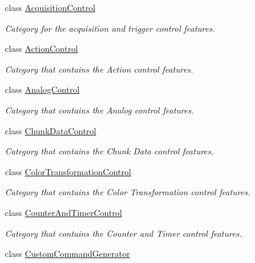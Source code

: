 \begin{DoxyCompactItemize}
\item 
class \hyperlink{classmv_i_m_p_a_c_t_1_1acquire_1_1_gen_i_cam_1_1_acquisition_control}{Acquisition\+Control}
\begin{DoxyCompactList}\small\item\em Category for the acquisition and trigger control features. \end{DoxyCompactList}\item 
class \hyperlink{classmv_i_m_p_a_c_t_1_1acquire_1_1_gen_i_cam_1_1_action_control}{Action\+Control}
\begin{DoxyCompactList}\small\item\em Category that contains the Action control features. \end{DoxyCompactList}\item 
class \hyperlink{classmv_i_m_p_a_c_t_1_1acquire_1_1_gen_i_cam_1_1_analog_control}{Analog\+Control}
\begin{DoxyCompactList}\small\item\em Category that contains the Analog control features. \end{DoxyCompactList}\item 
class \hyperlink{classmv_i_m_p_a_c_t_1_1acquire_1_1_gen_i_cam_1_1_chunk_data_control}{Chunk\+Data\+Control}
\begin{DoxyCompactList}\small\item\em Category that contains the Chunk Data control features. \end{DoxyCompactList}\item 
class \hyperlink{classmv_i_m_p_a_c_t_1_1acquire_1_1_gen_i_cam_1_1_color_transformation_control}{Color\+Transformation\+Control}
\begin{DoxyCompactList}\small\item\em Category that contains the Color Transformation control features. \end{DoxyCompactList}\item 
class \hyperlink{classmv_i_m_p_a_c_t_1_1acquire_1_1_gen_i_cam_1_1_counter_and_timer_control}{Counter\+And\+Timer\+Control}
\begin{DoxyCompactList}\small\item\em Category that contains the Counter and Timer control features. \end{DoxyCompactList}\item 
class \hyperlink{classmv_i_m_p_a_c_t_1_1acquire_1_1_gen_i_cam_1_1_custom_command_generator}{Custom\+Command\+Generator}

\end{DoxyCompactItemize}
